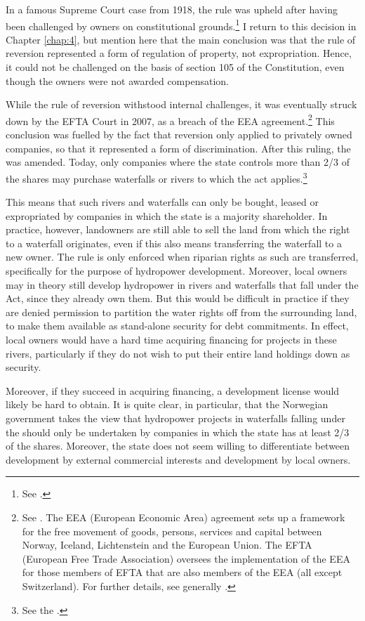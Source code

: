 In a famous Supreme Court case from 1918, the rule was upheld after having been challenged by owners on constitutional grounds.\footnote{See \cite{johansen18}.} I return to this decision in Chapter \ref{chap:4}, but mention here that the main conclusion was that the rule of reversion represented a form of regulation of property, not expropriation. Hence, it could not be challenged on the basis of section 105 of the Constitution, even though the owners were not awarded compensation.

While the rule of reversion withstood internal challenges, it was eventually struck down by the EFTA Court in 2007, as a breach of the EEA agreement.\footnote{See \cite{efta07}. The EEA (European Economic Area) agreement sets up a framework for the free movement of goods, persons, services and capital between Norway, Iceland, Lichtenstein and the European Union. The EFTA (European Free Trade Association) oversees the implementation of the EEA for those members of EFTA that are also members of the EEA (all except Switzerland). For further details, see generally \cite{bull94,magnussen02,fredriksen09}.} This conclusion was fuelled by the fact that reversion only applied to privately owned companies, so that it represented a form of discrimination. After this ruling, the \cite{ica17} was amended. Today, only companies where the state controls more than 2/3 of the shares may purchase waterfalls or rivers to which the act applies.\footnote{See the \cite[2]{ica17}.}

This means that such rivers and waterfalls can only be bought, leased or expropriated by companies in which the state is a majority shareholder. In practice, however, landowners are still able to sell the land from which the right to a waterfall originates, even if this also means transferring the waterfall to a new owner. The rule is only enforced when riparian rights as such are transferred, specifically for the purpose of hydropower development. Moreover, local owners may in theory still develop hydropower in rivers and waterfalls that fall under the Act, since they already own them. But this would be difficult in practice if they are denied permission to partition the water rights off from the surrounding land, to make them available as stand-alone security for debt commitments. In effect, local owners would have a hard time acquiring financing for projects in these rivers, particularly if they do not wish to put their entire land holdings down as security.

Moreover, if they succeed in acquiring financing, a development license would likely be hard to obtain. It is quite clear, in particular, that the Norwegian government takes the view that hydropower projects in waterfalls falling under the \cite{ica17} should only be undertaken by companies in which the state has at least 2/3 of the shares. Moreover, the state does not seem willing to differentiate between development by external commercial interests and development by local owners.

